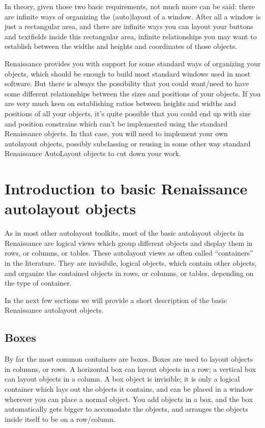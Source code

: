 In theory, given those two basic requirements, not much more can be
said: there are infinite ways of organizing the (auto)layout of a
window.  After all a window is just a rectangular area, and there are
infinite ways you can layout your buttons and textfields inside this
rectangular area, infinite relationships you may want to establish
between the widths and heights and coordinates of those objects.

Renaissance provides you with support for some standard ways of organizing
your objects, which should be enough to build most standard windows
used in most software.  But there is always the possibility that you
could want/need to have some different relationships between the sizes
and positions of your objects.  If you are very much keen on
establishing ratios between heights and widths and positions of all
your objects, it's quite possible that you could end up with size and
position constrains which can't be implemented using the standard
Renaissance objects.  In that case, you will need to implement your own
autolayout objects, possibly subclassing or reusing in some other way
standard Renaissance AutoLayout objects to cut down your work.

\section{Introduction to basic Renaissance autolayout objects}

As in most other autolayout toolkits, most of the basic autolayout
objects in Renaissance are logical views which group different objects and
display them in rows, or columns, or tables.  These autolayout views
as often called ``containers'' in the literature.  They are
invisibile, logical objects, which contain other objects, and organize
the contained objects in rows, or columns, or tables, depending on the
type of container.

In the next few sections we will provide a short description of the
basic Renaissance autolayout objects.

\subsection{Boxes}
By far the most common containers are boxes.  Boxes are used to layout
objects in columns, or rows.  A horizontal box can layout objects in a
row; a vertical box can layout objects in a column.  A box object is
invisible; it is only a logical container which lays out the objects
it contains, and can be placed in a window wherever you can place a
normal object.  You add objects in a box, and the box automatically
gets bigger to accomodate the objects, and arranges the objects inside
itself to be on a row/column.


